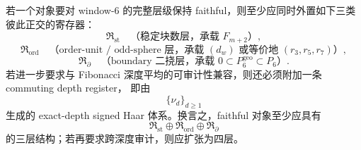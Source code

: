 \begin{conjecture}\label{conj:conclusion-window6-three-four-register-faithful-carrier}
若一个对象要对 window-\(6\) 的完整层级保持 faithful，则至少应同时外置如下三类彼此正交的寄存器：
\[
\mathfrak R_{\mathrm{st}}
\quad\text{（稳定块数层，承载 }F_{m+2}\text{）},
\]
\[
\mathfrak R_{\mathrm{ord}}
\quad\text{（order-unit / odd-sphere 层，承载 }(d_w)\text{ 或等价地 }(r_3,r_5,r_7)\text{）},
\]
\[
\mathfrak R_{\partial}
\quad\text{（boundary 二挠层，承载 }0\subset P_6^{\mathrm{geo}}\subset P_6\text{）}.
\]
若进一步要求与 Fibonacci 深度平均的可审计性兼容，则还必须附加一条 commuting depth register，
即由
\[
\{\nu_d\}_{d\ge 1}
\]
生成的 exact-depth signed Haar 体系。换言之，faithful 对象至少应具有
\[
\mathfrak R_{\mathrm{st}}\oplus \mathfrak R_{\mathrm{ord}}\oplus \mathfrak R_{\partial}
\]
的三层结构；若再要求跨深度审计，则应扩张为四层。
\end{conjecture}
